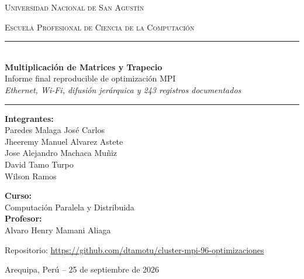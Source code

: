 \documentclass[11pt,a4paper]{article}
\begin{document}
\begin{titlepage}
    \centering
    \vspace*{1.2cm}
    {\scshape\LARGE Universidad Nacional de San Agustín \par}
    \vspace{0.3cm}
    {\scshape\large Escuela Profesional de Ciencia de la Computación \par}
    \vspace{2.1cm}
    \rule{\linewidth}{0.5mm}\\[0.4cm]
    {\huge\bfseries Multiplicación de Matrices y Trapecio\\[0.12cm]}
    {\Large Informe final reproducible de optimización MPI\\[0.2cm]}
    {\normalsize\itshape Ethernet, Wi-Fi, difusión jerárquica y 243 registros documentados\\[0.35cm]}
    \rule{\linewidth}{0.5mm}
    \vspace{2.4cm}
    \begin{minipage}[t]{0.5\textwidth}
        \textbf{Integrantes:}\\
        Paredes Malaga José Carlos\\
        Jheeremy Manuel Alvarez Astete\\
        Jose Alejandro Machaca Muñiz\\
        David Tamo Turpo\\
        Wilson Ramos
    \end{minipage}
    \hfill
    \begin{minipage}[t]{0.42\textwidth}
        \raggedleft
        \textbf{Curso:}\\
        Computación Paralela y Distribuida\\[0.2cm]
        \textbf{Profesor:}\\
        Alvaro Henry Mamani Aliaga
    \end{minipage}
    \vfill
    {\large Repositorio: \url{https://github.com/dtamotu/cluster-mpi-96-optimizaciones}\par}
    {\large Arequipa, Perú -- 25 de septiembre de 2026\par}
\end{titlepage}
\tableofcontents
\clearpage
{}



\clearpage
\appendix

\end{document}
